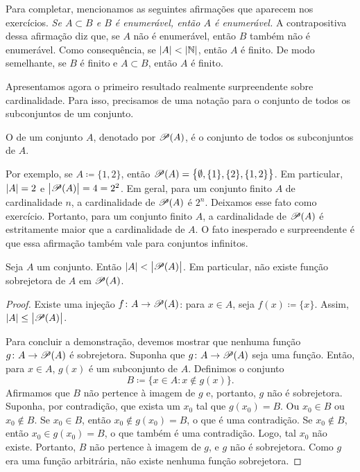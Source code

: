 Para completar, mencionamos as seguintes afirmações que aparecem nos
exercícios.
\emph{Se $A \subset
B$ e $B$ é enumerável, então $A$ é enumerável.} A contrapositiva dessa
afirmação diz que, se $A$ não é enumerável, então $B$ também não é
enumerável.
Como consequência, se $\lvert {A} \rvert < \lvert {{\mathbb{N}}} \rvert$, então $A$ é
finito.
De modo semelhante, se $B$ é finito e $A \subset B$, então $A$ é finito.

\pagebreak[2]
Apresentamos agora o primeiro resultado realmente surpreendente sobre
cardinalidade.
Para isso, precisamos de uma notação para
o conjunto de todos os subconjuntos de um conjunto.

\begin{defn}
O \emph{} de um conjunto $A$, denotado por
${\mathscr{P}}(A)$, é o conjunto de todos os subconjuntos de $A$.
\end{defn}

Por exemplo, se $A \coloneqq \{ 1,2\}$,
então ${\mathscr{P}}(A) = \bigl\{ \emptyset, \{ 1 \}, \{ 2 \}, \{ 1, 2 \} \bigr\}$.
Em particular, $\lvert {A} \rvert = 2$ e $\bigl\lvert {{\mathscr{P}}(A)} \bigr\rvert = 4 = 2^2$.
Em geral,
para um conjunto finito $A$ de cardinalidade $n$,
a cardinalidade de ${\mathscr{P}}(A)$ é $2^n$.
Deixamos esse fato como exercício.
Portanto, para um conjunto finito $A$,
a cardinalidade de ${\mathscr{P}}(A)$ é estritamente
maior que a
cardinalidade de $A$. O fato inesperado e
surpreendente é que essa afirmação também vale para conjuntos infinitos.

\begin{thm}
\label{cantorspowersetthm}
Seja $A$ um conjunto. Então
$\lvert {A} \rvert < \bigl\lvert {{\mathscr{P}}(A)} \bigr\rvert$.
Em particular, não existe função sobrejetora de
$A$ em ${\mathscr{P}}(A)$.
\end{thm}

\begin{proof}
Existe uma injeção $f \colon A \to {\mathscr{P}}(A)$:
para $x \in A$, seja $f(x) \coloneqq \{ x \}$. Assim,
$\lvert {A} \rvert \leq \bigl\lvert {{\mathscr{P}}(A)} \bigr\rvert$.

Para concluir a demonstração, devemos mostrar que
nenhuma função $g \colon A \to {\mathscr{P}}(A)$ é sobrejetora.
Suponha que
$g \colon A \to {\mathscr{P}}(A)$ seja uma função. Então, para $x \in A$,
$g(x)$ é um subconjunto de $A$. Definimos o conjunto
\begin{equation*}
B \coloneqq \bigl\{ x \in A : x \notin g(x) \bigr\} .
\end{equation*}
Afirmamos que $B$ não pertence à imagem de $g$ e, portanto, $g$ não é
sobrejetora. Suponha, por contradição, que exista um $x_0$ tal que
$g(x_0) = B$.
Ou $x_0 \in B$ ou $x_0 \notin B$. Se $x_0 \in B$, então $x_0 \notin
g(x_0) = B$, o que é uma contradição. Se $x_0 \notin B$, então $x_0 \in
g(x_0) = B$, o que também é uma contradição. Logo, tal $x_0$ não
existe. Portanto, $B$ não pertence à imagem de $g$, e $g$ não é
sobrejetora. Como $g$ era uma função arbitrária, não existe nenhuma função
sobrejetora.
\end{proof}

